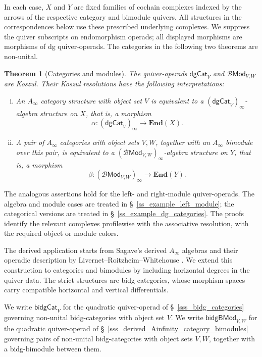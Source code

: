 \documentclass[11pt,letterpaper]{article}
\numberwithin{equation}{section}
\theoremstyle{plain}
\newcounter{mainthm}
\newtheorem{main}[mainthm]{Theorem}
\theoremstyle{definition}
\theoremstyle{remark}
\begin{document}
In each case, $X$ and $Y$ are fixed families of cochain complexes indexed by the arrows of the respective category and bimodule quivers. All structures in the correspondences below use these prescribed underlying complexes. We suppress the quiver subscripts on endomorphism operads; all displayed morphisms are morphisms of dg quiver-operads. The categories in the following two theorems are non-unital.

\begin{main}[Categories and modules]
The quiver-operads $\mathsf{dgCat}_V$ and $\mathscr B\mathsf{Mod}_{V,W}$ are Koszul. Their Koszul resolutions have the following interpretations:
\begin{enumerate}[(i)]
\itemsep 1pt
\item An $A_\infty$ category structure with object set $V$ is equivalent to a $(\mathsf{dgCat}_V)_\infty$-algebra structure on $X$, that is, a morphism
\[
\alpha:(\mathsf{dgCat}_V)_\infty
\longrightarrow \mathbf{End}(X).
\]
\item A pair of $A_\infty$ categories with object sets $V,W$, together with an $A_\infty$ bimodule over this pair, is equivalent to a $(\mathscr B\mathsf{Mod}_{V,W})_\infty$-algebra structure on $Y$, that is, a morphism
\[
\beta:(\mathscr B\mathsf{Mod}_{V,W})_\infty
\longrightarrow \mathbf{End}(Y).
\]
\end{enumerate}
\end{main}
The analogous assertions hold for the left- and right-module quiver-operads. The algebra and module cases are treated in \S~\ref{ss_example_left_module}; the categorical versions are treated in \S~\ref{ss_example_dg_categories}. The proofs identify the relevant complexes profilewise with the associative resolution, with the required object or module colors.

The derived application starts from Sagave's derived $A_\infty$ algebras \cite{sagave2007dg} and their operadic description by Livernet--Roitzheim--Whitehouse \cite{Livernet_Roitzheim_Whitehouse_derived_Ainfinity}. We extend this construction to categories and bimodules by including horizontal degrees in the quiver data. The strict structures are bidg-categories, whose morphism spaces carry compatible horizontal and vertical differentials.

We write $\mathsf{bidgCat}_V$ for the quadratic quiver-operad of \S~\ref{sss_bidg_categories} governing non-unital bidg-categories with object set $V$. We write $\mathsf{bidgBMod}_{V,W}$ for the quadratic quiver-operad of \S~\ref{sss_derived_Ainfinity_category_bimodules} governing pairs of non-unital bidg-categories with object sets $V,W$, together with a bidg-bimodule between them.
\end{document}

